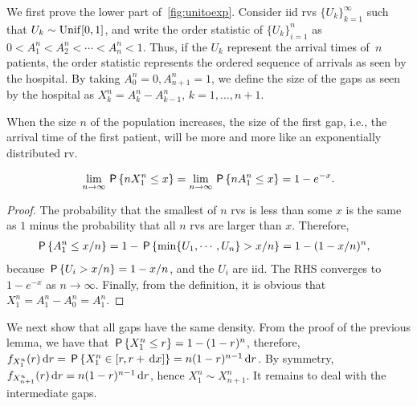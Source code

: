 \documentclass[stochastic-or.tex]{subfiles}
\begin{document}
We first prove the lower part of~\cref{fig:unitoexp}.
Consider iid rvs $\{U_k\}_{k=1}^{\infty}$ such that $U_{k}\sim \Unif{[0,1]}$, and write the order statistic of $\{U_k\}_{i=1}^{n}$ as $0<A^{n}_1 < A^n_2 < \cdots < A_n^{n}<1$.
Thus, if the $U_{k}$ represent the arrival times of~$n$ patients, the order statistic represents the ordered sequence of arrivals as seen by the hospital.
By taking $A_0^{n} = 0, A_{n+1}^n=1$, we define the size of the gaps as seen by the hospital as $X_{k}^{n} = A_k^n - A_{k-1}^{n}$, $k=1, \ldots, n+1$.


When the size $n$ of the population increases, the size of the first gap, i.e., the arrival time of the first patient, will be more and more like an exponentially distributed rv.

\begin{lemma}
\begin{equation*}
\lim_{n\to\infty} \P{n X^n_1 \leq x} = \lim_{n\to\infty} \P{n A^n_1 \leq x} =1- e^{-x}.
\end{equation*}
\end{lemma}
\begin{proof}
The probability that the smallest of $n$ rvs is less than some $x$ is the same as $1$ minus the probability that all $n$ rvs are larger than $x$.
Therefore,
\begin{align*}
  \P{ A^n_1 \leq x/n}
  &= 1 -  \P{\min\{U_{1}, \cdots, U_{n}\} > x/n} = 1 - (1-x/n)^{n},
\end{align*}
because $\P{U_{i} > x/n} = 1-x/n$, and the $U_{i}$ are iid.
The RHS converges to $1-e^{-x}$ as $n\to \infty$.
Finally, from the definition, it is obvious that $X_1^n = A_1^n - A_0^{n} = A_1^{n}$.
\end{proof}


We next show that all gaps have the same density.
From the proof of the previous lemma, we have that $\P{X_1^n \leq r} = 1- (1-r)^{n}$, therefore, $f_{X_{1}^{n}}(r) \d r = \P{X_1^n \in [r, r + \d x]} = n (1-r)^{n-1} \d r$.
By symmetry, $f_{X_{n+1}^{n}}(r) \d r = n(1-r)^{n-1} \d r$,  hence $X_1^n \sim X_{n+1}^{n}$. It remains to deal with the intermediate gaps.
\end{document}

